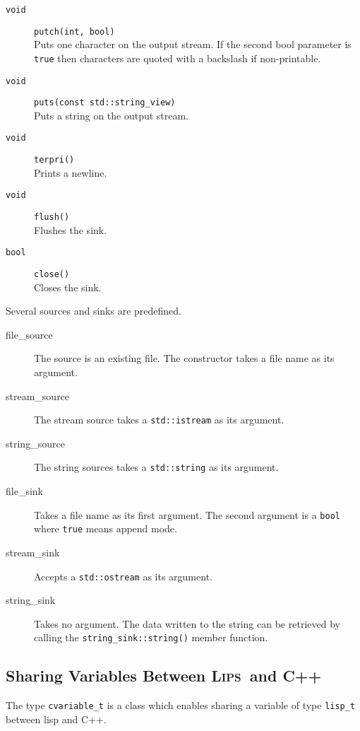 \documentclass[a4paper]{article}
\newcommand{\lips}{\textsc{Lips}}
\newcommand{\cpp}[1]{\texttt{#1}}
\begin{document}
\begin{description}
  \item[\cpp{void}] \cpp{putch(int, bool)} \\ Puts one character on
    the output stream. If the second bool parameter is \cpp{true} then
    characters are quoted with a backslash if non-printable.
  \item[\cpp{void}] \cpp{puts(const std::string\_view)} \\ Puts a
    string on the output stream.
  \item[\cpp{void}] \cpp{terpri()} \\ Prints a newline.
  \item[\cpp{void}] \cpp{flush()} \\ Flushes the sink.
  \item[\cpp{bool}] \cpp{close()} \\ Closes the sink.
\end{description}

Several sources and sinks are predefined.

\begin{description}
  \item[file\_source] The source is an existing file. The constructor
    takes a file name as its argument.
  \item[stream\_source] The stream source takes a \cpp{std::istream}
    as its argument.
  \item[string\_source] The string sources takes a \cpp{std::string}
    as its argument.
  \item[file\_sink] Takes a file name as its first argument. The
    second argument is a \cpp{bool} where \cpp{true} means append
    mode.
  \item[stream\_sink] Accepts a \cpp{std::ostream} as its argument.
  \item[string\_sink] Takes no argument. The data written to the
    string can be retrieved by calling the
    \cpp{string\_sink::string()} member function.
\end{description}

\subsection{Sharing Variables Between \lips\ and \textsf{C++}}
The type \cpp{cvariable\_t} is a class which enables sharing a
variable of type \cpp{lisp\_t} between lisp and \textsf{C++}.
\end{document}
